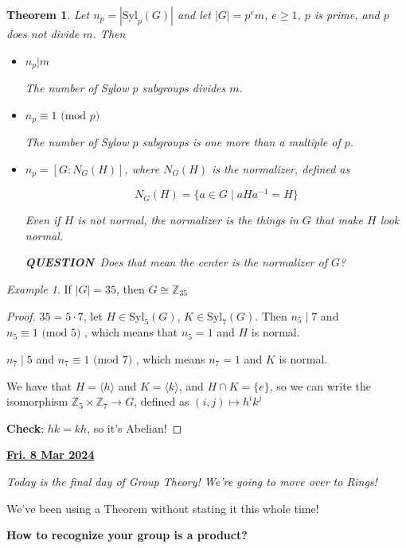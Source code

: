 \documentclass[12pt]{article}
\renewcommand{\date}[1]{\underline{\bf #1}}
\def\Syl{\text{Syl}}
\def\Z{{\mathbb Z}}
\def\QUESTION{\color{red}\textbf{QUESTION}\color{black}\,}
\newcommand{\lr}[1]{\langle #1 \rangle}
\renewcommand{\mod}[1]{\text{ (mod $#1$) }}
\newtheorem{theorem}{Theorem}
\theoremstyle{remark}
\theoremstyle{remark}
\theoremstyle{remark}
\newtheorem{example}{Example}
\theoremstyle{remark}
\theoremstyle{remark}
\begin{document}
\begin{theorem}
  Let $n_p = |\Syl_p(G)|$ and let $|G| = p^e m$, $e \ge 1$, $p$ is prime, and $p$
  does not divide $m$. Then

  \begin{itemize}
    \item $n_p | m$

      The number of Sylow $p$ subgroups divides $m$.

    \item $n_p \equiv 1 \mod p$

      The number of Sylow $p$ subgroups is one more than a multiple of $p$.

    \item $n_p = [G : N_G(H)]$, where $N_G(H)$ is the normalizer, defined as

      \[
        N_G(H) = \{a \in G \mid aHa^{-1} = H \}
      \]

      Even if $H$ is not normal, the normalizer is the things in $G$ that make $H$
      look normal.

      \QUESTION{} Does that mean the center is the normalizer of $G$?
  \end{itemize}
\end{theorem}

\begin{example}
  If $|G| = 35$, then $G \cong \Z_{35}$

  \begin{proof}
    $35 = 5 \cdot 7$, let $H \in \text{Syl}_5(G)$, $K \in
    \text{Syl}_7(G)$. Then $n_5 \mid 7$ and $n_5 \equiv 1 \mod 5$, which means that
    $n_5 = 1$ and $H$ is normal.

    $n_7 \mid 5$ and $n_7 \equiv 1 \mod 7$, which means $n_7 = 1$  and $K$ is
    normal.

    We have that $H = \lr{h}$ and $K = \lr{k}$, and $H \cap K = \{e\}$, so we can
    write the isomorphism $\Z_5 \times \Z_7 \to G$, defined as $(i, j) \mapsto h^i
    k^j$

    {\bf Check}: $hk = kh$, so it's Abelian!
  \end{proof}
\end{example}

\date{Fri. 8 Mar 2024}

{\it Today is the final day of Group Theory! We're going to move over to Rings!}

We've been using a Theorem without stating it this whole time!

{\bf How to recognize your group is a product?}
\end{document}
